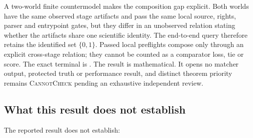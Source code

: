 A two-world finite countermodel makes the composition gap explicit.  Both
worlds have the same observed stage artifacts and pass the same local source,
rights, parser and entrypoint gates, but they differ in an unobserved relation
stating whether the artifacts share one scientific identity.  The end-to-end
query therefore retains the identified set $\{0,1\}$.  Passed local preflights
compose only through an explicit cross-stage relation; they cannot be counted
as a comparator loss, tie or score.  The exact terminal is
.
The result is mathematical.  It opens no matcher output, protected truth or
performance result, and distinct theorem priority remains
\textsc{CannotCheck} pending an exhaustive independent review.

\subsection{What this result does not establish}

The reported result does not establish:

